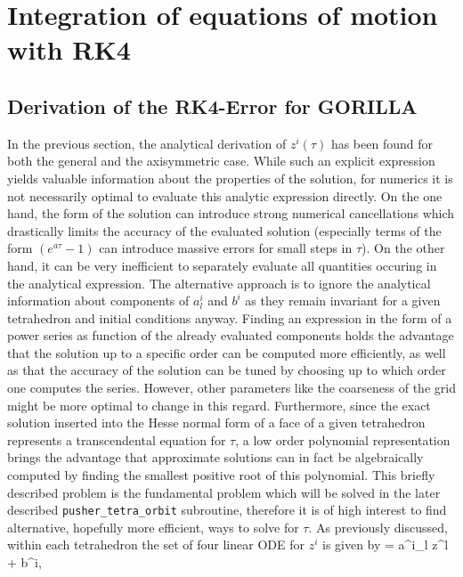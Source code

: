 \documentclass[./main.tex]{subfiles}
\begin{document}
\section{Integration of equations of motion with RK4}

\subsection{Derivation of the RK4-Error for GORILLA}
\noindent

In the previous section, the analytical derivation of $z^i(\tau)$ has been found for both the general and the axisymmetric case. While such an explicit expression yields valuable information about the properties of the solution, for numerics it is not necessarily optimal to evaluate this analytic expression directly. On the one hand, the form of the solution can introduce strong numerical cancellations which drastically limits the accuracy of the evaluated solution (especially terms of the form $(e^{a\tau}-1)$ can introduce massive errors for small steps in $\tau$). On the other hand, it can be very inefficient to separately evaluate all quantities occuring in the analytical expression. The alternative approach is to ignore the analytical information about components of $a^i_l$ and $b^i$ as they remain invariant for a given tetrahedron and initial conditions anyway. Finding an expression in the form of a power series as function of the already evaluated components holds the advantage that the solution up to a specific order can be computed more efficiently, as well as that the accuracy of the solution can be tuned by choosing up to which order one computes the series. However, other parameters like the coarseness of the grid might be more optimal to change in this regard. Furthermore, since the exact solution inserted into the Hesse normal form of a face of a given tetrahedron represents a transcendental equation for $\tau$, a low order polynomial representation brings the advantage that approximate solutions can in fact be algebraically computed by finding the smallest positive root of this polynomial. This briefly described problem is the fundamental problem which will be solved in the later described \texttt{pusher\_tetra\_orbit} subroutine, therefore it is of high interest to find alternative, hopefully more efficient, ways to solve for $\tau$.  
\newline
As previously discussed, within each tetrahedron the set of four linear ODE for $z^i$ is given by
\be{}
 = a^i_l z^l + b^i,
\ee
\end{document}
